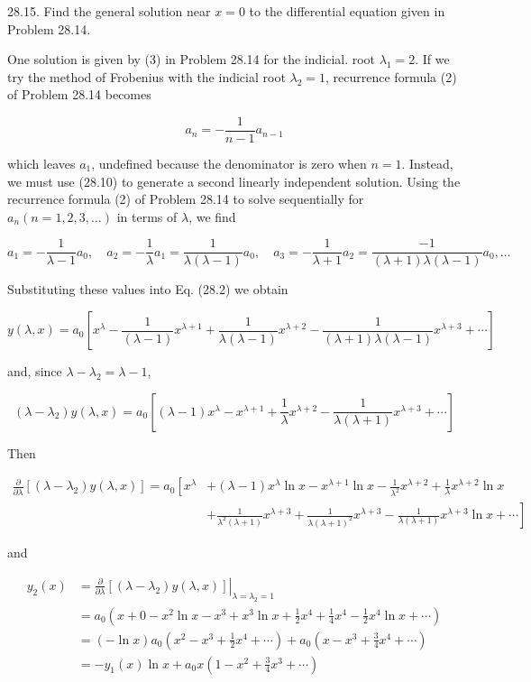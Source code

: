\documentclass[10pt]{article}
\begin{document}
28.15. Find the general solution near $x=0$ to the differential equation given in Problem 28.14.

One solution is given by (3) in Problem 28.14 for the indicial. root $\lambda_{1}=2$. If we try the method of Frobenius with the indicial root $\lambda_{2}=1$, recurrence formula (2) of Problem 28.14 becomes

$$
a_{n}=-\frac{1}{n-1} a_{n-1}
$$

which leaves $a_{1}$, undefined because the denominator is zero when $n=1$. Instead, we must use (28.10) to generate a second linearly independent solution. Using the recurrence formula (2) of Problem 28.14 to solve sequentially for $a_{n}(n=1,2,3, \ldots)$ in terms of $\lambda$, we find

$$
a_{1}=-\frac{1}{\lambda-1} a_{0}, \quad a_{2}=-\frac{1}{\lambda} a_{1}=\frac{1}{\lambda(\lambda-1)} a_{0}, \quad a_{3}=-\frac{1}{\lambda+1} a_{2}=\frac{-1}{(\lambda+1) \lambda(\lambda-1)} a_{0}, \ldots
$$

Substituting these values into Eq. (28.2) we obtain

$$
y(\lambda, x)=a_{0}\left[x^{\lambda}-\frac{1}{(\lambda-1)} x^{\lambda+1}+\frac{1}{\lambda(\lambda-1)} x^{\lambda+2}-\frac{1}{(\lambda+1) \lambda(\lambda-1)} x^{\lambda+3}+\cdots\right]
$$

and, since $\lambda-\lambda_{2}=\lambda-1$,

$$
\left(\lambda-\lambda_{2}\right) y(\lambda, x)=a_{0}\left[(\lambda-1) x^{\lambda}-x^{\lambda+1}+\frac{1}{\lambda} x^{\lambda+2}-\frac{1}{\lambda(\lambda+1)} x^{\lambda+3}+\cdots\right]
$$

Then

$$
\begin{aligned}
\frac{\partial}{\partial \lambda}\left[\left(\lambda-\lambda_{2}\right) y(\lambda, x)\right]=a_{0}\left[x^{\lambda}\right. & +(\lambda-1) x^{\lambda} \ln x-x^{\lambda+1} \ln x-\frac{1}{\lambda^{2}} x^{\lambda+2}+\frac{1}{\lambda} x^{\lambda+2} \ln x \\
& \left.+\frac{1}{\lambda^{2}(\lambda+1)} x^{\lambda+3}+\frac{1}{\lambda(\lambda+1)^{2}} x^{\lambda+3}-\frac{1}{\lambda(\lambda+1)} x^{\lambda+3} \ln x+\cdots\right]
\end{aligned}
$$

and

$$
\begin{aligned}
y_{2}(x) & =\left.\frac{\partial}{\partial \lambda}\left[\left(\lambda-\lambda_{2}\right) y(\lambda, x)\right]\right|_{\lambda=\lambda_{2}=1} \\
& =a_{0}\left(x+0-x^{2} \ln x-x^{3}+x^{3} \ln x+\frac{1}{2} x^{4}+\frac{1}{4} x^{4}-\frac{1}{2} x^{4} \ln x+\cdots\right) \\
& =(-\ln x) a_{0}\left(x^{2}-x^{3}+\frac{1}{2} x^{4}+\cdots\right)+a_{0}\left(x-x^{3}+\frac{3}{4} x^{4}+\cdots\right) \\
& =-y_{1}(x) \ln x+a_{0} x\left(1-x^{2}+\frac{3}{4} x^{3}+\cdots\right)
\end{aligned}
$$
\end{document}
